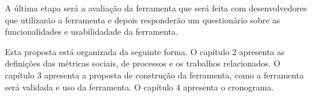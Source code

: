 A última etapa será a avaliação da ferramenta que será feita com desenvolvedores que utilizarão a ferramenta e depois responderão um questionário sobre as funcionalidades e usabilidadade da ferramenta.  

Esta proposta está organizada da seguinte forma. O capítulo 2 apresenta as definições das métricas sociais, de processos e os trabalhos relacionados. O capítulo 3 apresenta a proposta de construção da ferramenta, como a ferramenta será validada e uso da ferramenta. O capítulo 4 apresenta o cronograma.